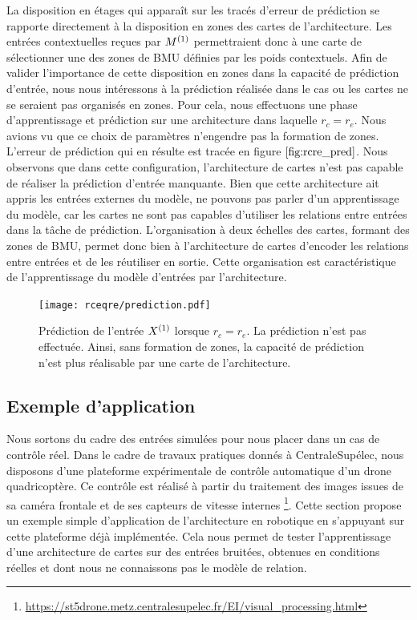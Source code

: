 \documentclass[../main]{subfiles}
\begin{document}
La disposition en étages qui apparaît sur les tracés d'erreur de prédiction se rapporte directement à la disposition en zones des cartes de l'architecture.
Les entrées contextuelles reçues par $M^{({1})}$ permettraient donc à une carte de sélectionner une des zones de BMU définies par les poids contextuels.
Afin de valider l'importance de cette disposition en zones dans la capacité de prédiction d'entrée, nous nous intéressons à la prédiction réalisée dans le cas ou les cartes ne se seraient pas organisés en zones.
Pour cela, nous effectuons une phase d'apprentissage et prédiction sur une architecture dans laquelle $r_c = r_e$. 
Nous avions vu que ce choix de paramètres n'engendre pas la formation de zones. L'erreur de prédiction qui en résulte est tracée en figure $\ref{fig:rcre_pred}$.
Nous observons que dans cette configuration, l'architecture de cartes n'est pas capable de réaliser la prédiction d'entrée manquante.
Bien que cette architecture ait appris les entrées externes du modèle, ne pouvons pas parler d'un apprentissage du modèle, car les cartes ne sont pas capables d'utiliser les relations entre entrées dans la tâche de prédiction.
L'organisation à deux échelles des cartes, formant des zones de BMU, permet donc bien à l'architecture de cartes d'encoder les relations entre entrées et de les réutiliser en sortie. Cette organisation est caractéristique de l'apprentissage du modèle d'entrées par l'architecture.

\begin{figure}
	\centering\texttt{[image: rceqre/prediction.pdf]}
	\caption{Prédiction de l'entrée $X^{({1})}$ lorsque $r_c = r_e$. La prédiction n'est pas effectuée. Ainsi, sans formation de zones, la capacité de prédiction n'est plus réalisable par une carte de l'architecture. \label{fig:rcre_pred}}
\end{figure}

\subsection{Exemple d'application}

Nous sortons du cadre des entrées simulées pour nous placer dans un cas de contrôle réel.
Dans le cadre de travaux pratiques donnés à CentraleSupélec, nous disposons d'une plateforme expérimentale de contrôle automatique d'un drone quadricoptère.
Ce contrôle est réalisé à partir du traitement des images issues de sa caméra frontale et de ses capteurs de vitesse internes \footnote{\url{https://st5drone.metz.centralesupelec.fr/EI/visual_processing.html}}.
Cette section propose un exemple simple d'application de l'architecture en robotique en s'appuyant sur cette plateforme déjà implémentée. Cela nous permet de tester l'apprentissage d'une architecture de cartes sur des entrées bruitées, obtenues en conditions réelles et dont nous ne connaissons pas le modèle de relation.
\end{document}
